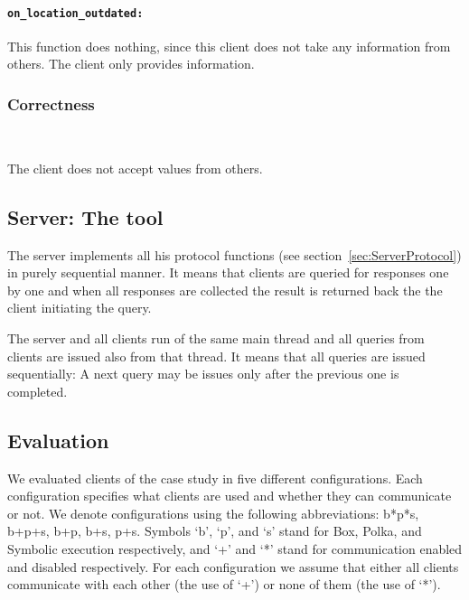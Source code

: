 \documentclass[envcountsame]{llncs}
\begin{document}
\paragraph{\tt on\_location\_outdated: }

This function does nothing, since this client does not take any information from
others. The client only provides information.

\subsubsection{Correctness}~\\
\label{sec:CorrectnessSE}

The client does not accept values from others.


\subsection{Server: The tool}
\label{sec:ServerSTATOR}

The server implements all his protocol functions (see
section~\ref{sec:ServerProtocol}) in purely sequential manner. It means that
clients are queried for responses one by one and when all responses are
collected the result is returned back the the client initiating the query.

The server and all clients run of the same main thread and all queries from
clients are issued also from that thread. It means that all queries are issued
sequentially: A next query may be issues only after the previous one is
completed.


\subsection{Evaluation}
\label{sec:Evaluation}

We evaluated clients of the case study in five different configurations. Each
configuration specifies what clients are used and whether they can communicate
or not. We denote configurations using the following abbreviations: b*p*s,
b+p+s, b+p, b+s, p+s. Symbols `b', `p', and `s' stand for Box, Polka, and
Symbolic execution respectively, and `+' and `*' stand for communication enabled
and disabled respectively. For each configuration we assume that either all
clients communicate with each other (the use of `+') or none of them (the use of
`*').
\end{document}
